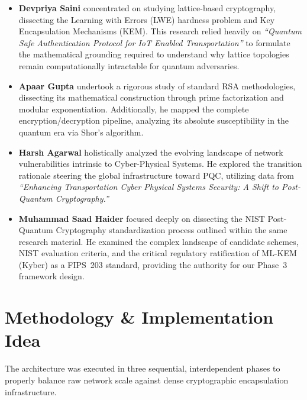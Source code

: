 \documentclass[12pt]{article}
\begin{document}
\begin{itemize}
    \item \textbf{Devpriya Saini} concentrated on studying lattice-based cryptography, dissecting the Learning with Errors (LWE) hardness problem and Key Encapsulation Mechanisms (KEM). This research relied heavily on \textit{``Quantum Safe Authentication Protocol for IoT Enabled Transportation''} to formulate the mathematical grounding required to understand why lattice topologies remain computationally intractable for quantum adversaries.

    \item \textbf{Apaar Gupta} undertook a rigorous study of standard RSA methodologies, dissecting its mathematical construction through prime factorization and modular exponentiation. Additionally, he mapped the complete encryption/decryption pipeline, analyzing its absolute susceptibility in the quantum era via Shor's algorithm.

    \item \textbf{Harsh Agarwal} holistically analyzed the evolving landscape of network vulnerabilities intrinsic to Cyber-Physical Systems. He explored the transition rationale steering the global infrastructure toward PQC, utilizing data from \textit{``Enhancing Transportation Cyber Physical Systems Security: A Shift to Post-Quantum Cryptography.''}

    \item \textbf{Muhammad Saad Haider} focused deeply on dissecting the NIST Post-Quantum Cryptography standardization process outlined within the same research material. He examined the complex landscape of candidate schemes, NIST evaluation criteria, and the critical regulatory ratification of ML-KEM (Kyber) as a FIPS~203 standard, providing the authority for our Phase~3 framework design.
\end{itemize}

\section{Methodology \& Implementation Idea}

The architecture was executed in three sequential, interdependent phases to properly balance raw network scale against dense cryptographic encapsulation infrastructure.
\end{document}
